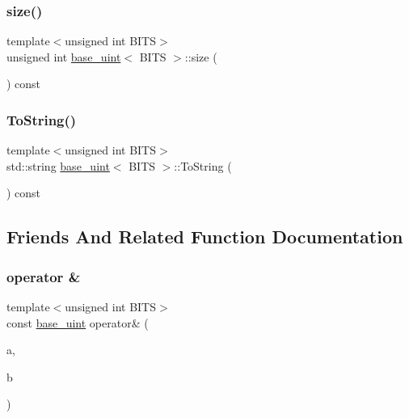 \mbox{\label{classbase__uint_a1f49b034e686269601ea89b0319b8004}} 
\subsubsection{\texorpdfstring{size()}{size()}}
{\footnotesize\ttfamily template$<$unsigned int B\+I\+TS$>$ \\
unsigned int \mbox{\hyperlink{classbase__uint}{base\+\_\+uint}}$<$ B\+I\+TS $>$\+::size (\begin{DoxyParamCaption}{ }\end{DoxyParamCaption}) const\hspace{0.3cm}{\ttfamily [inline]}}

\mbox{\label{classbase__uint_acccba4d9d51a0c36261718ca0cbb293b}} 
\subsubsection{\texorpdfstring{To\+String()}{ToString()}}
{\footnotesize\ttfamily template$<$unsigned int B\+I\+TS$>$ \\
std\+::string \mbox{\hyperlink{classbase__uint}{base\+\_\+uint}}$<$ B\+I\+TS $>$\+::To\+String (\begin{DoxyParamCaption}{ }\end{DoxyParamCaption}) const}



\subsection{Friends And Related Function Documentation}
\mbox{\label{classbase__uint_aa75064c879a5c59352c31ce6884dbf83}} 
\subsubsection{\texorpdfstring{operator \&}{operator \&}}
{\footnotesize\ttfamily template$<$unsigned int B\+I\+TS$>$ \\
const \mbox{\hyperlink{classbase__uint}{base\+\_\+uint}} operator\& (\begin{DoxyParamCaption}\item[{const \mbox{\hyperlink{classbase__uint}{base\+\_\+uint}}$<$ B\+I\+TS $>$ \&}]{a,  }\item[{const \mbox{\hyperlink{classbase__uint}{base\+\_\+uint}}$<$ B\+I\+TS $>$ \&}]{b }\end{DoxyParamCaption})\hspace{0.3cm}{\ttfamily [friend]}}

